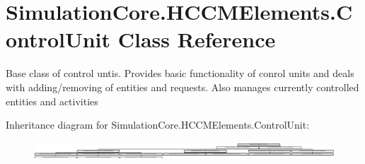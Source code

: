 \hypertarget{class_simulation_core_1_1_h_c_c_m_elements_1_1_control_unit}{}\section{Simulation\+Core.\+H\+C\+C\+M\+Elements.\+Control\+Unit Class Reference}
\label{class_simulation_core_1_1_h_c_c_m_elements_1_1_control_unit}


Base class of control untis. Provides basic functionality of conrol units and deals with adding/removing of entities and requests. Also manages currently controlled entities and activities  


Inheritance diagram for Simulation\+Core.\+H\+C\+C\+M\+Elements.\+Control\+Unit\+:\begin{figure}[H]
\begin{center}
\leavevmode
\includegraphics[height=0.671141cm]{class_simulation_core_1_1_h_c_c_m_elements_1_1_control_unit}
\end{center}
\end{figure}
